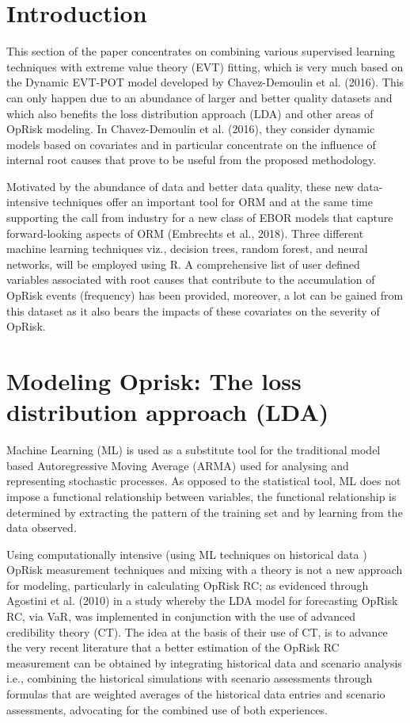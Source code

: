 \documentclass{DissertateUSU}
\begin{document}
\doublespacing

\section{Introduction}
\label{sec:Introduction}

This section of the paper concentrates on combining various supervised
learning techniques with extreme value theory (EVT) fitting, which is
very much based on the Dynamic EVT-POT model developed by
Chavez-Demoulin et al. (2016). This can only happen due to an abundance
of larger and better quality datasets and which also benefits the loss
distribution approach (LDA) and other areas of OpRisk modeling. In
Chavez-Demoulin et al. (2016), they consider dynamic models based on
covariates and in particular concentrate on the influence of internal
root causes that prove to be useful from the proposed methodology.

Motivated by the abundance of data and better data quality, these new
data-intensive techniques offer an important tool for ORM and at the
same time supporting the call from industry for a new class of EBOR
models that capture forward-looking aspects of ORM (Embrechts et al.,
2018). Three different machine learning techniques viz., decision trees,
random forest, and neural networks, will be employed using R. A
comprehensive list of user defined variables associated with root causes
that contribute to the accumulation of OpRisk events (frequency) has
been provided, moreover, a lot can be gained from this dataset as it
also bears the impacts of these covariates on the severity of OpRisk.

\section{Modeling Oprisk: The loss distribution approach (LDA)}
\label{sec:Modeling Oprisk: The loss distribution approach (LDA)}

Machine Learning (ML) is used as a substitute tool for the traditional
model based Autoregressive Moving Average (ARMA) used for analysing and
representing stochastic processes. As opposed to the statistical tool,
ML does not impose a functional relationship between variables, the
functional relationship is determined by extracting the pattern of the
training set and by learning from the data observed.\medskip 

Using computationally intensive (using ML techniques on historical data
) OpRisk measurement techniques and mixing with a theory is not a new
approach for modeling, particularly in calculating OpRisk RC; as
evidenced through Agostini et al. (2010) in a study whereby the LDA
model for forecasting OpRisk RC, via VaR, was implemented in conjunction
with the use of advanced credibility theory (CT). The idea at the basis
of their use of CT, is to advance the very recent literature that a
better estimation of the OpRisk RC measurement can be obtained by
integrating historical data and scenario analysis i.e., combining the
historical simulations with scenario assessments through formulas that
are weighted averages of the historical data entries and scenario
assessments, advocating for the combined use of both
experiences.\medskip 
\end{document}
